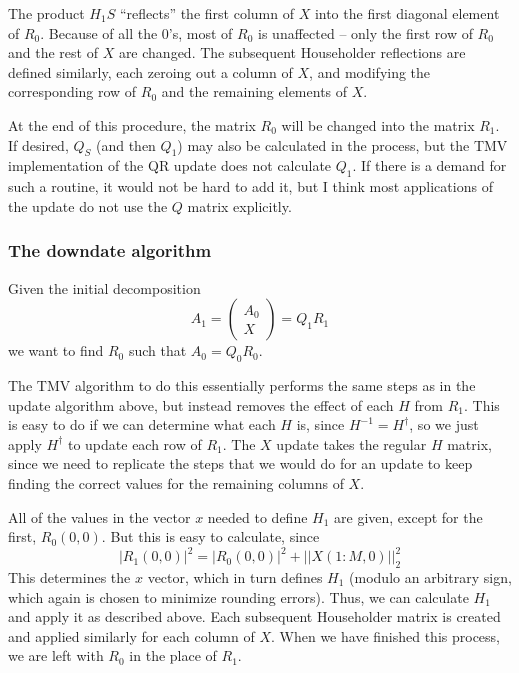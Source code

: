 \documentclass[twoside,letterpaper,11pt]{article}
\begin{document}
The product $H_1 S$ ``reflects'' the first column
of $X$ into the first diagonal element of $R_0$.  Because of all the $0$'s, 
most of $R_0$ is unaffected -- only the first row of $R_0$ and the rest of $X$
are changed.
The subsequent Householder reflections are defined similarly, each zeroing out
a column of $X$, and modifying the corresponding row of $R_0$ and the 
remaining elements of $X$.

At the end of this procedure, the matrix $R_0$ will be changed into the 
matrix $R_1$.  If desired, $Q_S$ (and then $Q_1$) 
may also be calculated in the process, but the 
TMV implementation of the QR update does not calculate $Q_1$.
If there is a demand for such a routine, it would not be hard to add it, 
but I think most applications of the update do not use the $Q$ matrix explicitly.

\subsubsection{The downdate algorithm}
\label{QRDowndate_Algorithm}

Given the initial decomposition
\begin{equation*}
A_1 = \left(\begin{array}{c}A_0 \\ X \end{array}\right) = Q_1 R_1 
\end{equation*}
we want to find $R_0$ such that $A_0 = Q_0 R_0$.

The TMV algorithm to do this essentially performs the same steps as in the update
algorithm above,
but instead removes the effect of each $H$ from $R_1$.
This is easy to
do if we can determine what each $H$ is, since $H^{-1} = H^\dagger$, so we just
apply $H^\dagger$ to update each row of $R_1$.  The $X$ update takes
the regular $H$ matrix, since we need to replicate the steps that we would do
for an update to keep finding the correct values for the remaining columns of $X$.

All of the values in the vector $x$ needed to define $H_1$ are given, except for the first,
$R_0(0,0)$.  But this is easy to calculate, since
\begin{equation*}
|R_1(0,0)|^2 = |R_0(0,0)|^2 + ||X(1:M,0)||_2^2
\end{equation*}
This determines the $x$ vector, which in turn defines $H_1$
(modulo an arbitrary sign, which again is chosen to minimize rounding errors).
Thus, we can calculate $H_1$ and apply it as described above.  Each subsequent Householder
matrix is created and applied similarly for each column of $X$.  When we have finished
this process, we are left with $R_0$ in the place of $R_1$.
\end{document}
